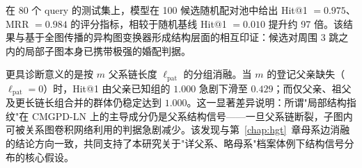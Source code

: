在 80 个 query 的测试集上，模型在 100 候选随机配对池中给出 Hit@1 $=0.975$、MRR $=0.984$ 的评分指标，相较于随机基线 Hit@1 $=0.010$ 提升约 97 倍。该结果与基于全图传播的异构图变换器形成结构层面的相互印证：候选对周围 3 跳之内的局部子图本身已携带极强的婚配判据。

更具诊断意义的是按 $m$ 父系链长度 $\ell_\mathrm{pat}$ 的分组消融。当 $m$ 的登记父亲缺失（$\ell_\mathrm{pat}=0$）时，Hit@1 由父亲已知组的 $1.000$ 急剧下滑至 $0.429$；而仅父亲、祖父及更长链长组合并的群体仍稳定达到 $1.000$。这一显著差异说明：所谓"局部结构指纹"在 CMGPD-LN 上的主导成分仍是父系结构信号——一旦父系链断裂，子图内可被关系图卷积网络利用的判据急剧减少。该发现与第~\ref{chap:hgt}~章母系边消融的结论方向一致，共同支持了本研究关于"详父系、略母系"档案体例下结构信号分布的核心假设。
